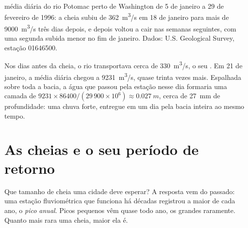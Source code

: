 \begin{omfigure}

{\small {} média diária do rio Potomac perto de Washington de 5 de
janeiro a 29 de fevereiro de 1996: a cheia subiu de \qty{362}{m^3/s} em 18
de janeiro para mais de \qty{9000}{m^3/s} três dias depois, e depois voltou
a cair nas semanas seguintes, com uma segunda subida menor no fim de
janeiro. Dados: U.S. Geological Survey, estação 01646500.}
\end{omfigure}

Nos dias antes da cheia, o rio transportava cerca de \qty{330}{m^3/s}, o seu
. Em 21 de janeiro, a média diária chegou a
\qty{9231}{m^3/s}, quase trinta vezes mais. Espalhada sobre toda a bacia, a
água que passou pela estação nesse dia formaria uma camada de
$9231 \times 86400 / (29\,900 \times 10^6) \approx \qty{0.027}{m}$, cerca de
\qty{27}{mm} de profundidade: uma chuva forte, entregue em um dia pela bacia
inteira ao mesmo tempo.

\section{As cheias e o seu período de retorno}

Que tamanho de cheia uma cidade deve esperar? A resposta vem do passado: uma
estação fluviométrica que funciona há décadas registrou a maior  de
cada ano, o \emph{pico anual}. Picos pequenos vêm quase todo ano, os grandes
raramente. Quanto mais rara uma cheia, maior ela é.

